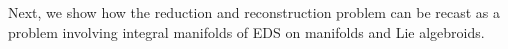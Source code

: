 \documentclass[11pt]{article}
\theoremstyle{plain}
\newtheorem{proposition}{Proposition}
\theoremstyle{definition}
\begin{document}

Next, we show how the reduction and reconstruction problem can be recast as a problem involving integral manifolds of EDS on manifolds and Lie algebroids.
\end{document}
